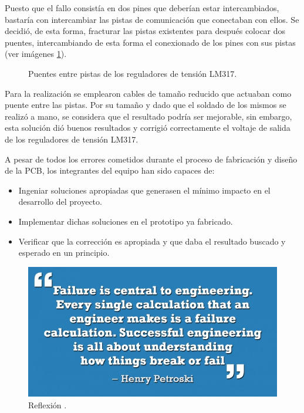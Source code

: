 \begin{itemize}
    Puesto que el fallo consistía en dos pines que deberían estar intercambiados, bastaría con intercambiar las pistas de comunicación que conectaban con ellos. Se decidió, de esta forma, fracturar las pistas existentes para después colocar dos puentes, intercambiando de esta forma el conexionado de los pines con sus pistas (ver imágenes \ref{fig:puentes}).
    
    \begin{figure}[H]
    \centering
    \hfill
    \caption{Puentes entre pistas de los reguladores de tensión LM317.}
    \label{fig:puentes}
    \end{figure}
    
    Para la realización se emplearon cables de tamaño reducido que actuaban como puente entre las pistas. Por su tamaño y dado que el soldado de los mismos se realizó a mano, se considera que el resultado podría ser mejorable, sin embargo, esta solución dió buenos resultados y corrigió correctamente el voltaje de salida de los reguladores de tensión LM317.
    
\end{itemize}

A pesar de todos los errores cometidos durante el proceso de fabricación y diseño de la \ac{PCB}, los integrantes del equipo han sido capaces de: 

\begin{itemize}
    \item Ingeniar soluciones apropiadas que generasen el mínimo impacto en el desarrollo del proyecto.
    \item Implementar dichas soluciones en el prototipo ya fabricado.
    \item Verificar que la corrección es apropiada y que daba el resultado buscado y esperado en un principio.
\end{itemize}

 \begin{figure}[H]
    \centering 
    \includegraphics[width=0.5\linewidth]{pictures/Quote.jpg}
    \caption{Reflexión \cite{noauthor_10_2018}.}
 \end{figure}



